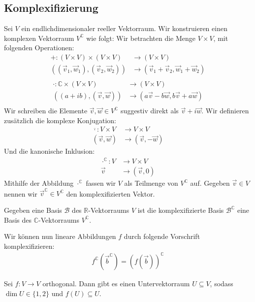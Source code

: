 \documentclass{report}
\newcommand{\bC}{\mathbb{C}}
\newcommand{\bR}{\mathbb{R}}
\newcommand{\cB}{\mathcal{B}}
\newcommand{\bb}{\vec{b}}
\newcommand{\vv}{\vec{v}}
\newcommand{\vw}{\vec{w}}
\begin{document}
\subsection{Komplexifizierung}
Sei $V$ ein endlichdimensionaler reeller Vektorraum. Wir konstruieren einen komplexen Vektorraum $V^\bC$ wie folgt: Wir betrachten die Menge $V \times V$, mit folgenden Operationen:
\begin{align*}
 + :  (V \times V) \times (V \times V) &\to (V \times V)\\
 ((\vv_1,\vw_1),(\vv_2, \vw_2)) &\to (\vv_1 + \vv_2, \vw_1 + \vw_2)\\
\end{align*}
\begin{align*}
 \cdot : \bC \times (V \times V) &\to (V \times V)\\
 ((a + ib), (\vv, \vw)) &\to (a\vv - b\vw, b\vv + a\vw)\\
\end{align*}
Wir schreiben die Elemente $\vv, \vw \in V^\bC$ suggestiv direkt als $\vv + i\vw$. Wir definieren zusätzlich die komplexe Konjugation:
\begin{align*}
 \overline{\cdot} : V \times V &\to V \times V\\
                    (\vv, \vw) &\to (\vv, - \vw)
\end{align*}
Und die kanonische Inklusion:
\begin{align*}
 \cdot^\bC : V &\to V \times V\\
                    \vv &\to (\vv, 0)
\end{align*}
Mithilfe der Abbildung $\cdot^\bC$ fassen wir $V$ als Teilmenge von $V^\bC$ auf. Gegeben $\vv \in V$ nennen wir $\vv^\bC \in V^\bC$ den komplexifizierten Vektor.
\begin{lemma}
 Gegeben eine Basis $\cB$ des $\bR$-Vektorraums $V$ ist die komplexifizierte Basis $\cB^\bC$ eine Basis des $\bC$-Vektorraums $V^\bC$.
\end{lemma}
\noindent
Wir können nun lineare Abbildungen $f$ durch folgende Vorschrift komplexifizieren:
\begin{align*}
 f^\bC(\bb^\bC) = (f(\bb))^\bC
\end{align*}
\begin{lemma}
 Sei $f : V \to V$ orthogonal. Dann gibt es einen Untervektorraum $U \subseteq V$, sodass $\dim U \in \{1,2\}$ und $f(U) \subseteq U$.
\end{lemma}
\end{document}
